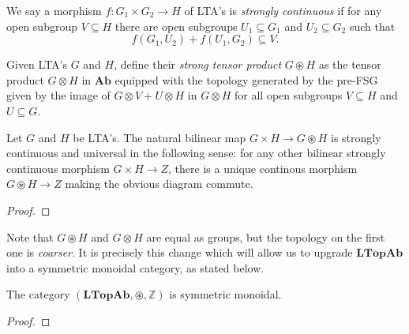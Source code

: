 \begin{definition} We say a morphism $f : G_1 \times G_2 \rightarrow H$ of LTA's is \emph{strongly continuous} if for any open subgroup $V \subseteq H$ there are open subgroups $U_1 \subseteq G_1$ and $U_2 \subseteq G_2$ such that \[f(G_1, U_2) + f(U_1, G_2) \subseteq V.\]
\end{definition}

\begin{definition} Given LTA's $G$ and $H$, define their \emph{strong tensor product} $G \circledast H$ as the tensor product $G \otimes H$ in $\textbf{Ab}$ equipped with the topology generated by the pre-FSG given by the image of $G \otimes V + U \otimes H$ in $G \otimes H$ for all open subgroups $V \subseteq H$ and $U \subseteq G$.
\end{definition}

\begin{proposition} Let $G$ and $H$ be LTA's. The natural bilinear map $G \times H \rightarrow G \circledast H$ is strongly continuous and universal in the following sense: for any other bilinear strongly continuous morphism $G \times H \rightarrow Z$, there is a unique continous morphism $G \circledast H \rightarrow Z$ making the obvious diagram commute.
\end{proposition}
\begin{proof} \TODO
\end{proof}


\noindent Note that $G \circledast H$ and $G \otimes H$ are equal as groups, but the topology on the first one is \emph{coarser}. It is precisely this change which will allow us to upgrade $\textbf{LTopAb}$ into a symmetric monoidal category, as stated below.

\begin{theorem}\label{thm:ltopab_is_monoidal} The category $(\textbf{LTopAb}, \circledast, \mathbb{Z})$ is symmetric monoidal.
\end{theorem}
\begin{proof} \TODO
\end{proof}
